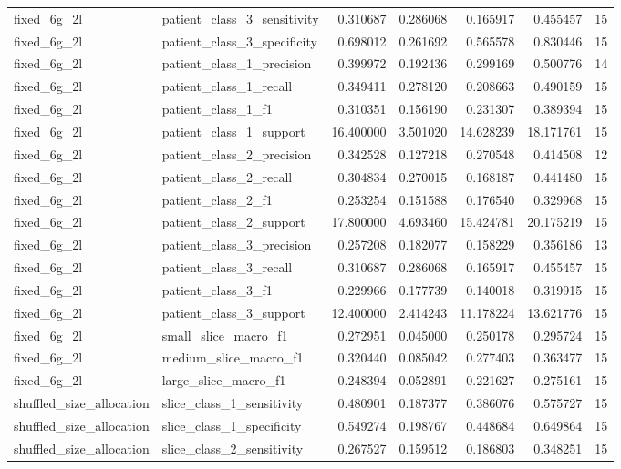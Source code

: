 \begin{tabular}{llrrrrr}
fixed_6g_2l & patient_class_3_sensitivity & 0.310687 & 0.286068 & 0.165917 & 0.455457 & 15 \\
fixed_6g_2l & patient_class_3_specificity & 0.698012 & 0.261692 & 0.565578 & 0.830446 & 15 \\
fixed_6g_2l & patient_class_1_precision & 0.399972 & 0.192436 & 0.299169 & 0.500776 & 14 \\
fixed_6g_2l & patient_class_1_recall & 0.349411 & 0.278120 & 0.208663 & 0.490159 & 15 \\
fixed_6g_2l & patient_class_1_f1 & 0.310351 & 0.156190 & 0.231307 & 0.389394 & 15 \\
fixed_6g_2l & patient_class_1_support & 16.400000 & 3.501020 & 14.628239 & 18.171761 & 15 \\
fixed_6g_2l & patient_class_2_precision & 0.342528 & 0.127218 & 0.270548 & 0.414508 & 12 \\
fixed_6g_2l & patient_class_2_recall & 0.304834 & 0.270015 & 0.168187 & 0.441480 & 15 \\
fixed_6g_2l & patient_class_2_f1 & 0.253254 & 0.151588 & 0.176540 & 0.329968 & 15 \\
fixed_6g_2l & patient_class_2_support & 17.800000 & 4.693460 & 15.424781 & 20.175219 & 15 \\
fixed_6g_2l & patient_class_3_precision & 0.257208 & 0.182077 & 0.158229 & 0.356186 & 13 \\
fixed_6g_2l & patient_class_3_recall & 0.310687 & 0.286068 & 0.165917 & 0.455457 & 15 \\
fixed_6g_2l & patient_class_3_f1 & 0.229966 & 0.177739 & 0.140018 & 0.319915 & 15 \\
fixed_6g_2l & patient_class_3_support & 12.400000 & 2.414243 & 11.178224 & 13.621776 & 15 \\
fixed_6g_2l & small_slice_macro_f1 & 0.272951 & 0.045000 & 0.250178 & 0.295724 & 15 \\
fixed_6g_2l & medium_slice_macro_f1 & 0.320440 & 0.085042 & 0.277403 & 0.363477 & 15 \\
fixed_6g_2l & large_slice_macro_f1 & 0.248394 & 0.052891 & 0.221627 & 0.275161 & 15 \\
shuffled_size_allocation & slice_class_1_sensitivity & 0.480901 & 0.187377 & 0.386076 & 0.575727 & 15 \\
shuffled_size_allocation & slice_class_1_specificity & 0.549274 & 0.198767 & 0.448684 & 0.649864 & 15 \\
shuffled_size_allocation & slice_class_2_sensitivity & 0.267527 & 0.159512 & 0.186803 & 0.348251 & 15 \\

\end{tabular}
